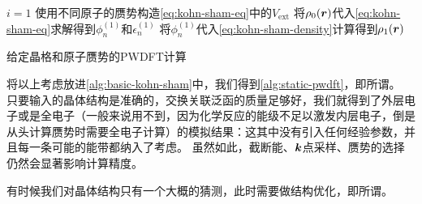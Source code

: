 \begin{algorithm}

    \DontPrintSemicolon
    \SetAlgoLined

    

    $i = 1$ \;
    使用不同原子的赝势构造\eqref{eq:kohn-sham-eq}中的$V_\text{ext}$ \;
    将$\rho_0(\vb*{r})$代入\eqref{eq:kohn-sham-eq}求解得到$\phi_n^{(1)}$和$\epsilon_n^{(1)}$ \;
    将$\phi_n^{(1)}$代入\eqref{eq:kohn-sham-density}计算得到$\rho_1(\vb*{r})$ \;
    
    \;

    \caption{给定晶格和原子赝势的PWDFT计算}
    \label{alg:static-pwdft}
\end{algorithm}

将以上考虑放进\autoref{alg:basic-kohn-sham}中，我们得到\autoref{alg:static-pwdft}，即所谓。
只要输入的晶体结构是准确的，交换关联泛函的质量足够好，我们就得到了外层电子或是全电子（一般来说用不到，因为化学反应的能级不足以激发内层电子，倒是从头计算赝势时需要全电子计算）的模拟结果：这其中没有引入任何经验参数，并且每一条可能的能带都纳入了考虑。
虽然如此，截断能、$\vb*{k}$点采样、赝势的选择仍然会显著影响计算精度。

有时候我们对晶体结构只有一个大概的猜测，此时需要做结构优化，即所谓。
